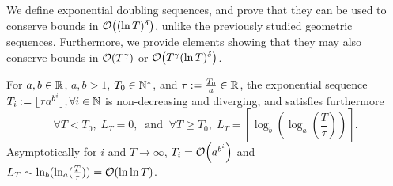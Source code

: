 \documentclass[12pt]{colt2018} %
\begin{document}
We define exponential doubling sequences, and prove that they can be used to conserve bounds in $\mathop{}\mathopen{}\mathcal{O}\mathopen{}\left((\ln T)^{\delta}\right)$, unlike the previously studied geometric sequences.
%
Furthermore, we provide elements showing that they may also conserve bounds in $\mathop{}\mathopen{}\mathcal{O}\mathopen{}\left(T^{\gamma}\right)$ or $\mathop{}\mathopen{}\mathcal{O}\mathopen{}\left(T^{\gamma}(\ln T)^{\delta}\right)$.



\begin{definition}\label{def:expSequence}
    For $a,b\in\mathbb{R}$, $a,b>1$, $T_0\in\mathbb{N}^*$,
    and $\tau := \frac{T_0}{a} \in \mathbb{R}$,
    the exponential sequence
    $T_i := \lfloor \tau a^{b^{i}} \rfloor, \forall i\in\mathbb{N}$
    is non-decreasing and diverging,
    and satisfies furthermore
    \begin{equation}\label{eq:expSequence}
        \forall T < T_0,\;
        L_{T} = 0,
        \;\;\text{and}\;\;
        \forall T \geq T_0,\;
        L_T = \left\lceil \log_b\left( \log_a\left( \frac{T}{\tau}\right)\right) \right\rceil.
    \end{equation}
    Asymptotically for $i$ and $T\to\infty$,
    $T_i = \mathop{}\mathopen{}\mathcal{O}\mathopen{}\left(a^{b^i}\right)$ and
    $L_T \sim \ln_b(\ln_a(\frac{T}{\tau})) = \mathop{}\mathopen{}\mathcal{O}\mathopen{}\left(\ln \ln T\right)$.
\end{definition}


\end{document}
